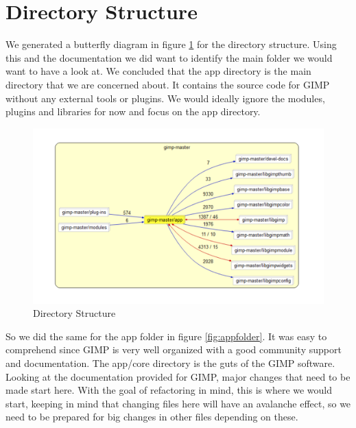 \section{Directory Structure}
We generated a butterfly diagram in figure \ref{fig:direc} for the directory structure. Using this and the documentation we did want to identify the main folder we would want to have a look at. We concluded that the app directory is the main directory that we are concerned about. It contains the source code for GIMP without any external tools or plugins. We would ideally ignore the modules, plugins and libraries for now and focus on the app directory. 
\begin{figure}[h]
\centering
\includegraphics[width=1\textwidth]{directorybutterfly.png}
\caption{\label{fig:direc}Directory Structure}
\end{figure}
So we did the same for the app folder in figure \ref{fig:appfolder}. It was easy to comprehend since GIMP is very well organized with a good community support and documentation. The app/core directory is the guts of the GIMP software. Looking at the documentation provided for GIMP, major changes that need to be made start here. With the goal of refactoring in mind, this is where we would start, keeping in mind that changing files here will have an avalanche effect, so we need to be prepared for big changes in other files depending on these.
